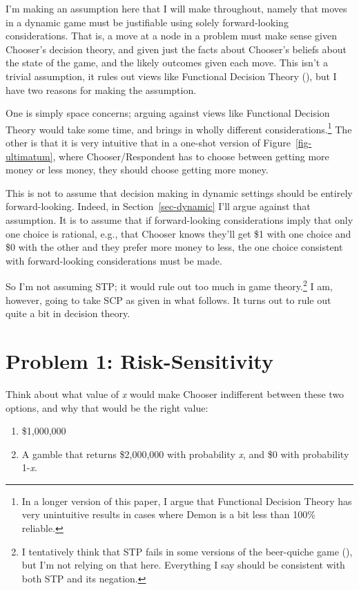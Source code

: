 \documentclass[
  11pt,
  letterpaper,
  DIV=11,
  numbers=noendperiod,
  twoside]{scrartcl}
\providecommand{\tightlist}{%
  \setlength{\itemsep}{0pt}\setlength{\parskip}{0pt}}
\begin{document}
I'm making an assumption here that I will make throughout, namely that
moves in a dynamic game must be justifiable using solely forward-looking
considerations. That is, a move at a node in a problem must make sense
given Chooser's decision theory, and given just the facts about
Chooser's beliefs about the state of the game, and the likely outcomes
given each move. This isn't a trivial assumption, it rules out views
like Functional Decision Theory
(), but I
have two reasons for making the assumption.

One is simply space concerns; arguing against views like Functional
Decision Theory would take some time, and brings in wholly different
considerations.\footnote{In a longer version of this paper, I argue that
  Functional Decision Theory has very unintuitive results in cases where
  Demon is a bit less than 100\% reliable.} The other is that it is very
intuitive that in a one-shot version of Figure~\ref{fig-ultimatum},
where Chooser/Respondent has to choose between getting more money or
less money, they should choose getting more money.

This is not to assume that decision making in dynamic settings should be
entirely forward-looking. Indeed, in Section~\ref{sec-dynamic} I'll
argue against that assumption. It is to assume that if forward-looking
considerations imply that only one choice is rational, e.g., that
Chooser knows they'll get \$1 with one choice and \$0 with the other and
they prefer more money to less, the one choice consistent with
forward-looking considerations must be made.

So I'm not assuming STP; it would rule out too much in game
theory.\footnote{I tentatively think that STP fails in some versions of
  the beer-quiche game (), but I'm not relying on that here. Everything I say should be
  consistent with both STP and its negation.} I am, however, going to
take SCP as given in what follows. It turns out to rule out quite a bit
in decision theory.

\section{Problem 1: Risk-Sensitivity}\label{sec-buchak}

Think about what value of \emph{x} would make Chooser indifferent
between these two options, and why that would be the right value:

\begin{enumerate}
\def\labelenumi{\arabic{enumi}.}
\tightlist
\item
  \$1,000,000
\item
  A gamble that returns \$2,000,000 with probability \emph{x}, and \$0
  with probability 1-\emph{x}.
\end{enumerate}
\end{document}
